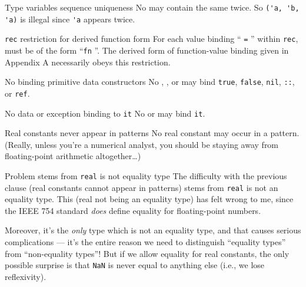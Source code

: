 \begin{clause}{Type variables sequence uniqueness}
No  may contain the same  twice. So \verb|('a, 'b, 'a)|
is illegal since \verb|'a| appears twice.
\end{clause}

\begin{clause}{\texttt{rec} restriction for derived function form}
For each value binding `` \texttt{=} '' within \texttt{rec},
 must be of the form ``\texttt{fn} ''. The derived form of
function-value binding given in Appendix A necessarily obeys this restriction.
\end{clause}

\begin{clause}{No binding primitive data constructors}
No , , or  may bind \texttt{true},
\texttt{false}, \texttt{nil}, \texttt{::}, or \texttt{ref}.
\end{clause}

\begin{clause}{No data or exception binding to \texttt{it}}
No  or  may bind \texttt{it}.
\end{clause}

\begin{clause}{Real constants never appear in patterns}
No real constant may occur in a pattern. (Really, unless you're a
numerical analyst, you should be staying away from floating-point
arithmetic altogether\dots)
\end{clause}

\begin{remark}{Problem stems from \texttt{real} is not equality type}
The difficulty with the previous clause (real constants cannot appear in
patterns) stems from \texttt{real} is not an equality type. This (real
not being an equality type) has felt wrong to me, since the IEEE 754
standard \emph{does} define equality for floating-point
numbers.

Moreover, it's the \emph{only} type which is not an equality
type, and that causes serious complications --- it's the entire reason we
need to distinguish ``equality types'' from ``non-equality types''! But
if we allow equality for real constants, the only possible surprise is
that \texttt{NaN} is never equal to anything else (i.e., we lose
reflexivity). 
\end{remark}

